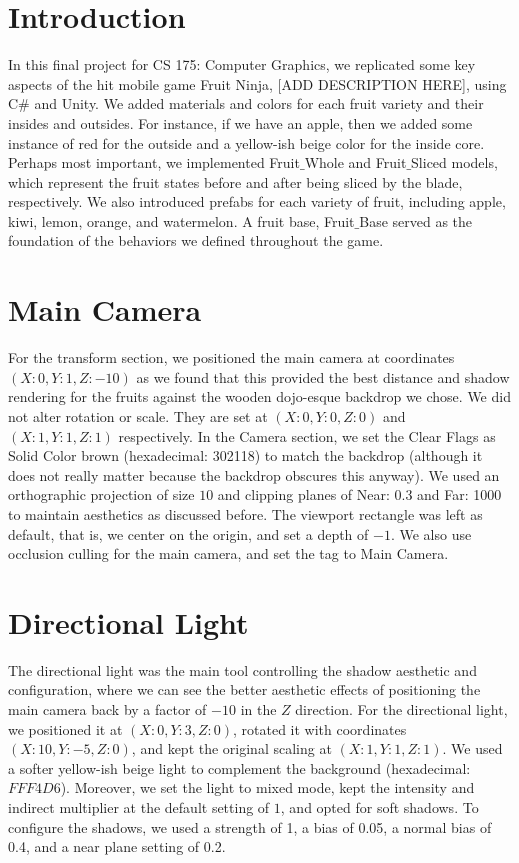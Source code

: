 \section{Introduction}

In this final project for CS 175: Computer Graphics, we replicated some key aspects of the hit mobile game Fruit Ninja, [ADD DESCRIPTION HERE], using C# and Unity. 
We added materials and colors for each fruit variety and their insides and outsides. For instance, if we have an apple, then we added some instance of red for the outside and 
a yellow-ish beige color for the inside core. Perhaps most important, we implemented Fruit$\_$Whole and Fruit$\_$Sliced models, which represent the fruit states before and after 
being sliced by the blade, respectively. We also introduced prefabs for each variety of fruit, including apple, kiwi, lemon, orange, and watermelon. A fruit base, Fruit$\_$Base 
served as the foundation of the behaviors we defined throughout the game.

\section{Main Camera}
For the transform section, we positioned the main camera at coordinates $(X: 0, Y: 1, Z: -10)$ as we found that this provided the best distance and shadow rendering for the 
fruits against the wooden dojo-esque backdrop we chose. We did not alter rotation or scale. They are set at $(X: 0, Y: 0, Z: 0)$ and $(X: 1, Y: 1, Z: 1)$ respectively. In the Camera section, we 
set the Clear Flags as Solid Color brown (hexadecimal: 302118) to match the backdrop (although it does not really matter because the backdrop obscures this anyway). We used an orthographic 
projection of size $10$ and clipping planes of Near: 0.3 and Far: 1000 to maintain aesthetics as discussed before. The viewport rectangle was left as default, that is, we center on the 
origin, and set a depth of $-1$. We also use occlusion culling for the main camera, and set the tag to Main Camera.

\section{Directional Light}
The directional light was the main tool controlling the shadow aesthetic and configuration, where we can see the better aesthetic effects of positioning the main camera
back by a factor of $-10$ in the $Z$ direction. For the directional light, we positioned it at $(X: 0, Y: 3, Z: 0)$, rotated it with coordinates $(X: 10, Y: -5, Z: 0)$, and kept the 
original scaling at $(X: 1, Y: 1, Z: 1)$. We used a softer yellow-ish beige light to complement the background (hexadecimal: $FFF4D6$). Moreover, we set the light to mixed mode, kept the 
intensity and indirect multiplier at the default setting of $1$, and opted for soft shadows. To configure the shadows, we 
used a strength of 1, a bias of 0.05, a normal bias of 0.4, and a near plane setting of 0.2. 


